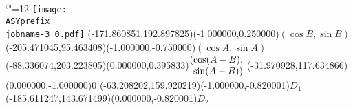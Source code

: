 \setlength{\unitlength}{1pt}
\makeatletter%
\let\ASYencoding\f@encoding%
\let\ASYfamily\f@family%
\let\ASYseries\f@series%
\let\ASYshape\f@shape%
\makeatother%
{\catcode`"=12%
\texttt{[image: \\ASYprefix\\jobname-3\_0.pdf]}%
}%
\color{ASYcolor}
\fontsize{12.000000}{14.400000}\selectfont
\usefont{\ASYencoding}{\ASYfamily}{\ASYseries}{\ASYshape}%
\ASYalign(-171.860851,192.897825)(-1.000000,0.250000){$(\cos B, \sin B)$}%
\color{ASYcolor}
\fontsize{12.000000}{14.400000}\selectfont
\ASYalign(-205.471045,95.463408)(-1.000000,-0.750000){$(\cos A, \sin A)$}%
\color{ASYcolor}
\fontsize{12.000000}{14.400000}\selectfont
\ASYalign(-88.336074,203.223805)(0.000000,0.395833){$\arraycolsep=0pt \begin{array}{rl} (& \cos (A-B), \\ & \sin (A-B)) \end{array}$}%
\color{ASYcolor}
\fontsize{12.000000}{14.400000}\selectfont
\ASYalign(-31.970928,117.634866)(0.000000,-1.000000){$0$}%
\color{ASYcolor}
\fontsize{12.000000}{14.400000}\selectfont
\ASYalign(-63.208202,159.920219)(-1.000000,-0.820001){$D_1$}%
\color{ASYcolor}
\fontsize{12.000000}{14.400000}\selectfont
\ASYalign(-185.611247,143.671499)(0.000000,-0.820001){$D_2$}%

